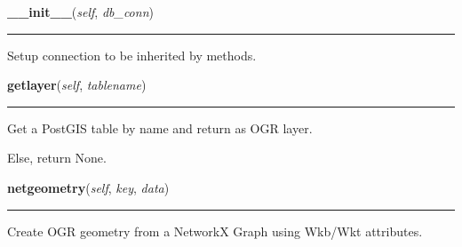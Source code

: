 \hspace{.8\funcindent}\begin{boxedminipage}{\funcwidth}

    \raggedright \textbf{\_\_init\_\_}(\textit{self}, \textit{db\_conn})

    \vspace{-1.5ex}

    \rule{\textwidth}{0.5\fboxrule}
\setlength{\parskip}{2ex}
    Setup connection to be inherited by methods.

\setlength{\parskip}{1ex}
    \end{boxedminipage}

    \label{nx_pgnet:write:getlayer}

    \vspace{0.5ex}

\hspace{.8\funcindent}\begin{boxedminipage}{\funcwidth}

    \raggedright \textbf{getlayer}(\textit{self}, \textit{tablename})

    \vspace{-1.5ex}

    \rule{\textwidth}{0.5\fboxrule}
\setlength{\parskip}{2ex}
    Get a PostGIS table by name and return as OGR layer.

    Else, return None.

\setlength{\parskip}{1ex}
    \end{boxedminipage}

    \label{nx_pgnet:write:netgeometry}

    \vspace{0.5ex}

\hspace{.8\funcindent}\begin{boxedminipage}{\funcwidth}

    \raggedright \textbf{netgeometry}(\textit{self}, \textit{key}, \textit{data})

    \vspace{-1.5ex}

    \rule{\textwidth}{0.5\fboxrule}
\setlength{\parskip}{2ex}
    Create OGR geometry from a NetworkX Graph using Wkb/Wkt attributes.

\setlength{\parskip}{1ex}
    \end{boxedminipage}

